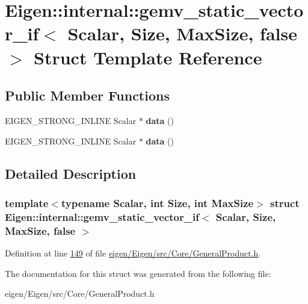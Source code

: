 \hypertarget{struct_eigen_1_1internal_1_1gemv__static__vector__if_3_01_scalar_00_01_size_00_01_max_size_00_01false_01_4}{}\section{Eigen\+:\+:internal\+:\+:gemv\+\_\+static\+\_\+vector\+\_\+if$<$ Scalar, Size, Max\+Size, false $>$ Struct Template Reference}
\label{struct_eigen_1_1internal_1_1gemv__static__vector__if_3_01_scalar_00_01_size_00_01_max_size_00_01false_01_4}
\subsection*{Public Member Functions}
\begin{DoxyCompactItemize}
\item 
\mbox{\label{struct_eigen_1_1internal_1_1gemv__static__vector__if_3_01_scalar_00_01_size_00_01_max_size_00_01false_01_4_a16edf30abac710e5f0fa2db44ed90644}} 
E\+I\+G\+E\+N\+\_\+\+S\+T\+R\+O\+N\+G\+\_\+\+I\+N\+L\+I\+NE Scalar $\ast$ {\bfseries data} ()
\item 
\mbox{\label{struct_eigen_1_1internal_1_1gemv__static__vector__if_3_01_scalar_00_01_size_00_01_max_size_00_01false_01_4_a16edf30abac710e5f0fa2db44ed90644}} 
E\+I\+G\+E\+N\+\_\+\+S\+T\+R\+O\+N\+G\+\_\+\+I\+N\+L\+I\+NE Scalar $\ast$ {\bfseries data} ()
\end{DoxyCompactItemize}


\subsection{Detailed Description}
\subsubsection*{template$<$typename Scalar, int Size, int Max\+Size$>$\newline
struct Eigen\+::internal\+::gemv\+\_\+static\+\_\+vector\+\_\+if$<$ Scalar, Size, Max\+Size, false $>$}



Definition at line \hyperlink{eigen_2_eigen_2src_2_core_2_general_product_8h_source_l00149}{149} of file \hyperlink{eigen_2_eigen_2src_2_core_2_general_product_8h_source}{eigen/\+Eigen/src/\+Core/\+General\+Product.\+h}.



The documentation for this struct was generated from the following file\+:\begin{DoxyCompactItemize}
\item 
eigen/\+Eigen/src/\+Core/\+General\+Product.\+h\end{DoxyCompactItemize}
